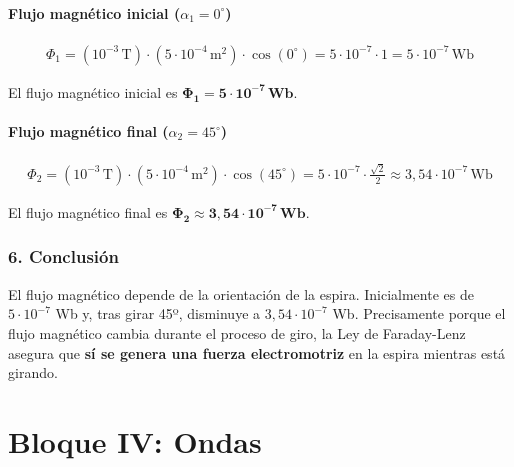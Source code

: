 \paragraph*{Flujo magnético inicial ($\alpha_1 = 0^\circ$)}
\begin{gather}
    \Phi_1 = (10^{-3}\,\text{T}) \cdot (5 \cdot 10^{-4}\,\text{m}^2) \cdot \cos(0^\circ) = 5 \cdot 10^{-7} \cdot 1 = 5 \cdot 10^{-7} \, \text{Wb}
\end{gather}
\begin{cajaresultado}
    El flujo magnético inicial es $\boldsymbol{\Phi_1 = 5 \cdot 10^{-7}\,\textbf{Wb}}$.
\end{cajaresultado}
\paragraph*{Flujo magnético final ($\alpha_2 = 45^\circ$)}
\begin{gather}
    \Phi_2 = (10^{-3}\,\text{T}) \cdot (5 \cdot 10^{-4}\,\text{m}^2) \cdot \cos(45^\circ) = 5 \cdot 10^{-7} \cdot \frac{\sqrt{2}}{2} \approx 3,54 \cdot 10^{-7} \, \text{Wb}
\end{gather}
\begin{cajaresultado}
    El flujo magnético final es $\boldsymbol{\Phi_2 \approx 3,54 \cdot 10^{-7}\,\textbf{Wb}}$.
\end{cajaresultado}

\subsubsection*{6. Conclusión}
\begin{cajaconclusion}
El flujo magnético depende de la orientación de la espira. Inicialmente es de $5 \cdot 10^{-7}$ Wb y, tras girar 45º, disminuye a $3,54 \cdot 10^{-7}$ Wb. Precisamente porque el flujo magnético cambia durante el proceso de giro, la Ley de Faraday-Lenz asegura que \textbf{sí se genera una fuerza electromotriz} en la espira mientras está girando.
\end{cajaconclusion}

\newpage

\section{Bloque IV: Ondas}
\label{sec:ondas_2019_jul_ext}


